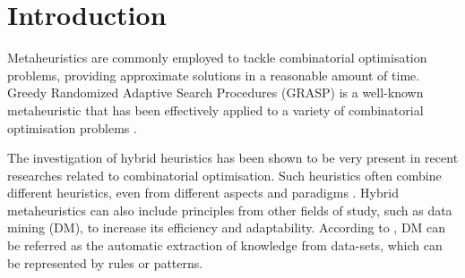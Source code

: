 \documentclass{singlecol-new}
\begin{document}
\begin{abstract}

The investigation of hybrid heuristics is very present in recent researches related to combinatorial optimisation. Hybridisation with Greedy Randomized Adaptive Search Procedures (GRASP) and data mining  is a successful example in the literature, where patterns observed in a high-quality solution can lead to effective exploration of the search space and a large decrease in computational time. In this work, data mining techniques are used to enhance a GRASP state-of-the-art heuristic for the prize-collecting covering tour problem.
Computational results revealed that the data mining proposals were able to match or enhance solution quality for a wide number of instances while also reducing execution time significantly. Statistical significance tests, evaluations of the influence of mining patterns, and time-to-target plots are presented to back up our findings.

\end{abstract}





\maketitle

\section{Introduction}
\label{sec:intro}

Metaheuristics are commonly employed to tackle combinatorial optimisation problems, providing approximate solutions in a reasonable amount of time. Greedy Randomized Adaptive Search Procedures (GRASP) is a well-known metaheuristic that has been effectively applied to a variety of combinatorial optimisation problems \cite{resende2019greedy}.

The investigation of hybrid heuristics has been shown to be very present in recent researches related to combinatorial optimisation. Such heuristics often combine different heuristics, even from different aspects and paradigms \cite{talbi2009metaheuristics}.
Hybrid metaheuristics can also include principles from other fields of study, such as data mining (DM), to increase its efficiency and adaptability. According to \citet{han2011data}, DM can be referred as the automatic extraction of knowledge from data-sets, which can be represented by rules or patterns.
\end{document}
